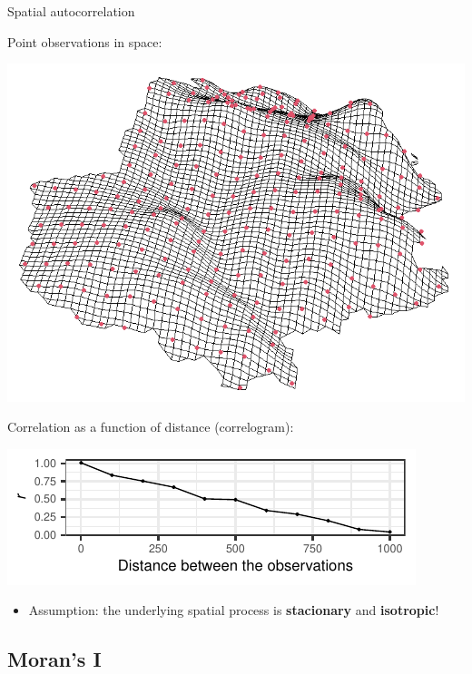 \documentclass[
  ignorenonframetext,
]{beamer}
\providecommand{\tightlist}{%
  \setlength{\itemsep}{0pt}\setlength{\parskip}{0pt}}
\begin{document}
\begin{frame}{Spatial autocorrelation}
\small

Point observations in space:

\includegraphics[width=10.17in,height=0.3\textheight]{terrain2}

Correlation as a function of distance (correlogram):

\includegraphics{Lecture_1_files/figure-beamer/unnamed-chunk-7-1.pdf}

\begin{itemize}
\tightlist
\item
  Assumption: the underlying spatial process is \textbf{stacionary} and
  \textbf{isotropic}!
\end{itemize}
\end{frame}

\hypertarget{morans-i}{%
\subsection{Moran's I}\label{morans-i}}
\end{document}
